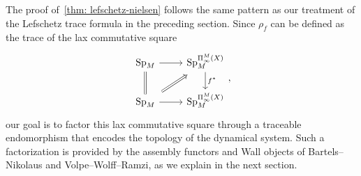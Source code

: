 The proof of~\cref{thm: lefschetz-nielsen} follows the same pattern as our treatment of the Lefschetz trace formula in the preceding section. Since $\rho_f$ can be defined as the trace of the lax commutative square
\begin{equation}
  \label{eq:reidemeister lax square}
  \begin{tikzcd}
    \Sp_\base\arrow[d,equal] \arrow[r] & \Sp_\base^{\ani{\tset}[\base]}\arrow[d,"f^*"]\\
    \Sp_\base\arrow[r]\arrow[ru,Rightarrow, shorten <=5pt,shorten >=5pt] & \Sp_\base^{\ani{\tset}[\base]}
  \end{tikzcd},
\end{equation}
our goal is to factor this lax commutative square through a traceable endomorphism that encodes the topology of the dynamical system. Such a factorization is provided by the assembly functors and Wall objects of Bartels--Nikolaus and Volpe--Wolff--Ramzi, as we explain in the next section.
